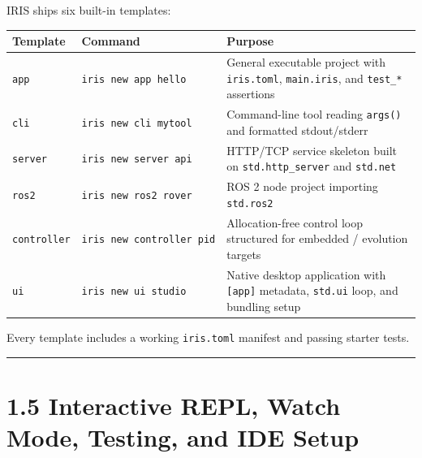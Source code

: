 \documentclass[
  english,
  oneside]{book}
\newcounter{none} %
\begin{document}
IRIS ships six built-in templates:

{\def\LTcaptype{none} %
\begin{longtable}[]{@{}
  >{\raggedright\arraybackslash}p{}
  >{\raggedright\arraybackslash}p{}
  >{\raggedright\arraybackslash}p{}@{}}
\toprule\noalign{}
\begin{minipage}[b]{\linewidth}\raggedright
Template
\end{minipage} & \begin{minipage}[b]{\linewidth}\raggedright
Command
\end{minipage} & \begin{minipage}[b]{\linewidth}\raggedright
Purpose
\end{minipage} \\
\midrule\noalign{}
\endhead
\bottomrule\noalign{}
\endlastfoot
\texttt{app} & \texttt{iris\ new\ app\ hello} & General executable
project with \texttt{iris.toml}, \texttt{main.iris}, and
\texttt{test\_*} assertions \\
\texttt{cli} & \texttt{iris\ new\ cli\ mytool} & Command-line tool
reading \texttt{args()} and formatted stdout/stderr \\
\texttt{server} & \texttt{iris\ new\ server\ api} & HTTP/TCP service
skeleton built on \texttt{std.http\_server} and \texttt{std.net} \\
\texttt{ros2} & \texttt{iris\ new\ ros2\ rover} & ROS 2 node project
importing \texttt{std.ros2} \\
\texttt{controller} & \texttt{iris\ new\ controller\ pid} &
Allocation-free control loop structured for embedded / evolution
targets \\
\texttt{ui} & \texttt{iris\ new\ ui\ studio} & Native desktop
application with \texttt{{[}app{]}} metadata, \texttt{std.ui} loop, and
bundling setup \\
\end{longtable}
}

Every template includes a working \texttt{iris.toml} manifest and
passing starter tests.

\begin{center}\rule{0.5\linewidth}{0.5pt}\end{center}

\section{1.5 Interactive REPL, Watch Mode, Testing, and IDE
Setup}\label{interactive-repl-watch-mode-testing-and-ide-setup}
\end{document}

